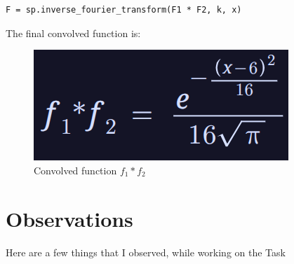 \documentclass[12pt]{report}
\begin{document}
\begin{lstlisting}[caption={Finding the Convolution}]
F = sp.inverse_fourier_transform(F1 * F2, k, x)
\end{lstlisting}

The final convolved function is:

\begin{figure}[H]
    \centering
    \includegraphics[width=0.5\linewidth]{F.png}
    \caption{Convolved function $f_1 \ast f_2$}
    \label{fig:F}
\end{figure}

\section{Observations}

Here are a few things that I observed, while working on the Task
\end{document}
